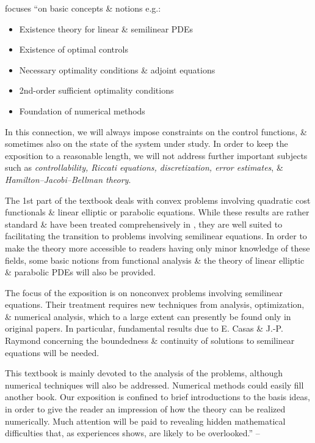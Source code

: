 \documentclass[oneside]{book}
\numberwithin{equation}{section}
\begin{document}
\cite{Troltzsch2010} focuses ``on basic concepts \& notions e.g.:
\begin{itemize}
	\item Existence theory for linear \& semilinear PDEs
	\item Existence of optimal controls
	\item Necessary optimality conditions \& adjoint equations
	\item 2nd-order sufficient optimality conditions
	\item Foundation of numerical methods
\end{itemize}
In this connection, we will always impose constraints on the control functions, \& sometimes also on the state of the system under study. In order to keep the exposition to a reasonable length, we will not address further important subjects such as \textit{controllability, Riccati equations, discretization, error estimates}, \& \textit{Hamilton--Jacobi--Bellman theory}.

The 1st part of the textbook deals with convex problems involving quadratic cost functionals \& linear elliptic or parabolic equations. While these results are rather standard \& have been treated comprehensively in \cite{Lions1971}, they are well suited to facilitating the transition to problems involving semilinear equations. In order to make the theory more accessible to readers having only minor knowledge of these fields, some basic notions from functional analysis \& the theory of linear elliptic \& parabolic PDEs will also be provided.

The focus of the exposition is on nonconvex problems involving semilinear equations. Their treatment requires new techniques from analysis, optimization, \& numerical analysis, which to a large extent can presently be found only in original papers. In particular, fundamental results due to E. Casas \& J.-P. Raymond concerning the boundedness \& continuity of solutions to semilinear equations will be needed.

This textbook is mainly devoted to the analysis of the problems, although numerical techniques will also be addressed. Numerical methods could easily fill another book. Our exposition is confined to brief introductions to the basis ideas, in order to give the reader an impression of how the theory can be realized numerically. Much attention will be paid to revealing hidden mathematical difficulties that, as experiences shows, are likely to be overlooked.'' -- \cite[Preface to the German edition, pp. xiii--xiv]{Troltzsch2010}
\end{document}
